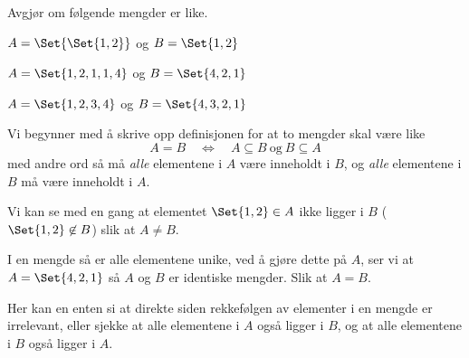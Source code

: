 \documentclass[a4paper,11pt]{article}
\begin{document}

\begin{problem}[20]
  Avgjør om følgende mengder er like.
  \begin{subproblem}
    \label{subproblem:1-mix-20a-MAT-0001-2019-V}
    $A = \Set{\Set{1,2}}$ og $B = \Set{1, 2}$ 
  \end{subproblem}
  \begin{subproblem}
    \label{subproblem:1-mix-20b-MAT-0001-2019-V}
    $A = \Set{1, 2, 1, 1, 4}$ og $B = \Set{4, 2, 1}$
  \end{subproblem}
  \begin{subproblem}
    \label{subproblem:1-mix-20c-MAT-0001-2019-V}
    $A = \Set{1, 2, 3, 4}$ og $B = \Set{4, 3, 2, 1}$
  \end{subproblem}
\end{problem}

\begin{solution}
  Vi begynner med å skrive opp definisjonen for at to mengder skal være like
  \begin{equation*}
    A = B 
    \quad \Leftrightarrow \quad 
    A \subseteq B \ \text{og} \ B \subseteq A
  \end{equation*}
  med andre ord så må \emph{alle} elementene i $A$ være inneholdt i $B$, og
  \emph{alle} elementene i $B$ må være inneholdt i $A$. \medskip

   Vi kan se med en gang at
  elementet $\Set{1,2} \in A$ ikke ligger i $B$ ($\Set{1,2} \not\in B$) slik at
  $A \neq B$.  \medskip

   I en mengde så er alle
  elementene unike, ved å gjøre dette på $A$, ser vi at $A = \Set{4,2,1}$ så $A$
  og $B$ er identiske mengder.  Slik at $A = B$.  \medskip

   Her kan en enten si at
   direkte siden rekkefølgen av elementer i en mengde er
  irrelevant, eller sjekke at alle elementene i $A$ også ligger i $B$, og at
  alle elementene i $B$ også ligger i $A$.
\end{solution}

\newpageLF
\end{document}
